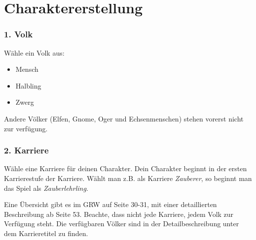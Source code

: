 \documentclass[a4paper,10pt,twoside,twocolumn,openany,nodeprecatedcode,bg=print]{dndbook}
\begin{document}
\chapter{Charaktererstellung}

\subsection{1. Volk}
Wähle ein Volk aus:
\begin{itemize}[noitemsep]
  \item Mensch
  \item Halbling
  \item Zwerg
\end{itemize}
Andere Völker (Elfen, Gnome, Oger und Echsenmenschen) stehen vorerst nicht zur verfügung.

\subsection{2. Karriere}
Wähle eine Karriere für deinen Charakter.
Dein Charakter beginnt in der ersten Karrierestufe der Karriere. Wählt man z.B. als Karriere \textit{Zauberer}, so beginnt man das Spiel als \textit{Zauberlehrling}.

Eine Übersicht gibt es im GRW auf Seite 30-31, mit einer detaillierten Beschreibung ab Seite 53.
Beachte, dass nicht jede Karriere, jedem Volk zur Verfügung steht. Die verfügbaren Völker sind in der Detailbeschreibung unter dem Karrieretitel zu finden.
\end{document}
